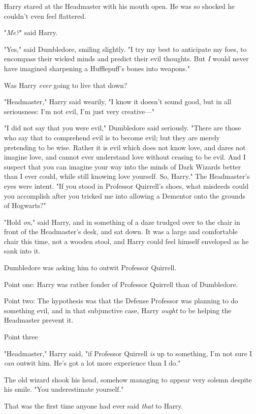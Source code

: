 Harry stared at the Headmaster with his mouth open. He was so shocked he
couldn't even feel flattered.

"\emph{Me?}" said Harry.

"Yes," said Dumbledore, smiling slightly. "I try my best to anticipate my foes,
to encompass their wicked minds and predict their evil thoughts. But \emph{I}
would never have imagined sharpening a Hufflepuff's bones into weapons."

Was Harry \emph{ever} going to live that down?

"Headmaster," Harry said wearily, "I know it doesn't sound good, but in all
seriousness: I'm not evil, I'm just very creative—"

"I did not say that you were evil," Dumbledore said seriously. "There are those
who say that to comprehend evil is to become evil; but they are merely
pretending to be wise. Rather it is evil which does not know love, and dares
not imagine love, and cannot ever understand love without ceasing to be evil.
And I suspect that you can imagine your way into the minds of Dark Wizards
better than I ever could, while still knowing love yourself. So, Harry." The
Headmaster's eyes were intent. "If you stood in Professor Quirrell's shoes,
what misdeeds could you accomplish after you tricked me into allowing a
Dementor onto the grounds of Hogwarts?"

"Hold \emph{on}," said Harry, and in something of a daze trudged over to the
chair in front of the Headmaster's desk, and sat down. It was a large and
comfortable chair this time, not a wooden stool, and Harry could feel himself
enveloped as he sank into it.

Dumbledore was asking him to outwit Professor Quirrell.

Point one: Harry was rather fonder of Professor Quirrell than of Dumbledore.

Point two: The hypothesis was that the Defense Professor was planning to do
something evil, and in that subjunctive case, Harry \emph{ought} to be helping
the Headmaster prevent it.

Point three{\el}

"Headmaster," Harry said, "if Professor Quirrell \emph{is} up to something, I'm
not sure I \emph{can} outwit him. He's got a lot more experience than I do."

The old wizard shook his head, somehow managing to appear very solemn despite
his smile. "You underestimate yourself."

That was the first time anyone had ever said \emph{that} to Harry.

